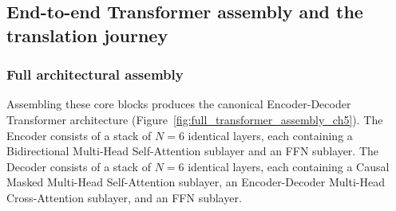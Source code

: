 \documentclass[../../../main.tex]{subfiles}
\begin{document}
\subsection{End-to-end Transformer assembly and the translation journey}
\label{subsec:end_to_end_translation_journey}

\subsubsection{Full architectural assembly}
Assembling these core blocks produces the canonical Encoder-Decoder Transformer architecture (Figure~\ref{fig:full_transformer_assembly_ch5}). The Encoder consists of a stack of $N = 6$ identical layers, each containing a Bidirectional Multi-Head Self-Attention sublayer and an FFN sublayer. The Decoder consists of a stack of $N = 6$ identical layers, each containing a Causal Masked Multi-Head Self-Attention sublayer, an Encoder-Decoder Multi-Head Cross-Attention sublayer, and an FFN sublayer.
\end{document}
